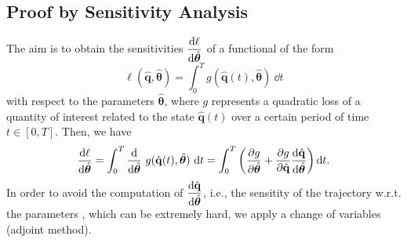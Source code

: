 \subsection*{Proof by Sensitivity Analysis}

The aim is to obtain the sensitivities $\displaystyle\dv{\ell}{\hat{\bm{\theta}}}$ of a functional of the form\\
$$\ell (\hat{\mathbf{q}},\hat{\bm{\theta}}) = \int_0^T g(\hat{\mathbf{q}}(t),\hat{\bm{\theta}})~\dd t$$
with respect to the parameters $\hat{\bm{\theta}}$, where $g$ represents a quadratic loss of a quantity of interest related to the state $\hat{\mathbf{q}}(t)$ over a certain period of time $t\in[0,T]$. Then, we have\\
$$\dv{\ell}{\hat{\bm{\theta}}} = \int_0^T \dv{\hat{\bm{\theta}}}~g(\hat{\mathbf{q}}(t),\hat{\bm{\theta}})~\dd t = \int_0^T \left(\pdv{g}{\hat{\bm{\theta}}} + \pdv{g}{\hat{\mathbf{q}}} \dv{\hat{\mathbf{q}}}{\hat{\bm{\theta}}} \right)\dd t.$$
In order to avoid the computation of $\displaystyle\dv{\hat{\mathbf{q}}}{\hat{\bm{\theta}}}$, i.e., the sensitity of the trajectory w.r.t. the parameters , which can be extremely hard, we apply a change of variables (adjoint method).

